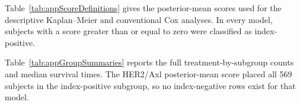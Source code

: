 Table~\ref{tab:appScoreDefinitions} gives the posterior-mean scores used for
the descriptive Kaplan--Meier and conventional Cox analyses. In every model,
subjects with a score greater than or equal to zero were classified as
index-positive.

\begin{table}[!htbp]
\caption[Posterior-mean biomarker scores]{Posterior-mean coefficients defining
the fixed-threshold biomarker scores. Each score has the form
$1+\mathbf z_i^{T}\widehat{\boldsymbol\gamma}$, and the index-positive group
is defined by a score greater than or equal to zero.}
\label{tab:appScoreDefinitions}
\centering
\scriptsize
{}
\end{table}

Table~\ref{tab:appGroupSummaries} reports the full treatment-by-subgroup
counts and median survival times. The HER2/Axl posterior-mean score placed all
569 subjects in the index-positive subgroup, so no index-negative rows exist
for that model.

